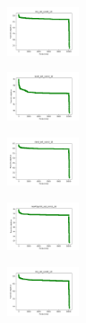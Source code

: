 \vspace*{\fill}
\newpage
\vspace*{\fill}

\begin{figure}[H]
    \centering
    \begin{subfigure}
        \centering
        \includegraphics[width=0.234\textwidth]{img/HS-LS/iris_set_const_10_949004259_cost.png}
    \end{subfigure}
    \hfill
    \begin{subfigure}
        \centering
        \includegraphics[width=0.234\textwidth]{img/HS-LS/ecoli_set_const_10_949004259_cost.png}
    \end{subfigure}
    \hfill
    \begin{subfigure}
        \centering
        \includegraphics[width=0.234\textwidth]{img/HS-LS/rand_set_const_10_949004259_cost.png}
    \end{subfigure}
    \hfill
    \begin{subfigure}
        \centering
        \includegraphics[width=0.234\textwidth]{img/HS-LS/newthyroid_set_const_10_949004259_cost.png}
    \end{subfigure}
    \hfill
    \begin{subfigure}
        \centering
        \includegraphics[width=0.234\textwidth]{img/HS-LS/iris_set_const_10_589741062_cost.png}

\end{subfigure}
\end{figure}
